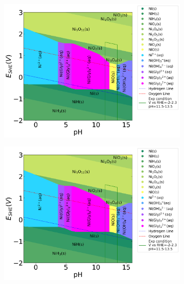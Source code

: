 \documentclass[journal=jacsat,manuscript=article]{achemso}
\begin{document}
\begin{figure}[htbp]
    \centering
    \begin{subfigure}[b]{0.32\textwidth}
        \subcaption{}\label{fig:Ni_Pourbaix_H2O}
        \includegraphics[width=\textwidth]{Figures/pourbaix_diagrams/Ni-NH3-H2O_activity=1e-04_[NH3]=0.02M_[Gly]=0.005M_[CN]=0.png}
    \end{subfigure}
    \hfill
    \begin{subfigure}[b]{0.32\textwidth}
        \subcaption{}\label{fig:Ni_Pourbaix_NH3_Gly}
        \includegraphics[width=\textwidth]{Figures/pourbaix_diagrams/Ni-NH3-H2O_activity=1e-04_[NH3]=0.02M_[Gly]=0.005M_[CN]=0.png}

\end{subfigure}
\end{figure}
\end{document}
